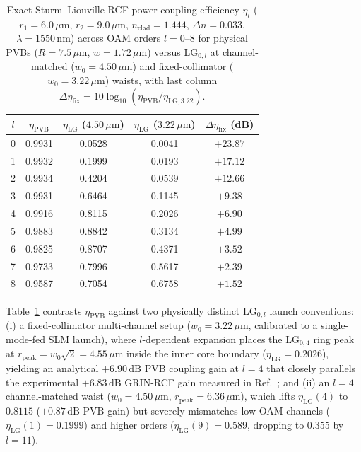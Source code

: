 \documentclass[aps,pra,reprint,nofootinbib,floatfix,longbibliography]{revtex4-2}
\begin{document}
\begin{table}[t]
\caption{Exact Sturm--Liouville RCF power coupling efficiency $\eta_l$ ($r_1 = 6.0\,\mu\mathrm{m}$, $r_2 = 9.0\,\mu\mathrm{m}$, $n_{\mathrm{clad}} = 1.444$, $\Delta n = 0.033$, $\lambda = 1550\,\mathrm{nm}$) across OAM orders $l = 0\text{--}8$ for physical PVBs ($R = 7.5\,\mu\mathrm{m}$, $w = 1.72\,\mu\mathrm{m}$) versus $\mathrm{LG}_{0,l}$ at channel-matched ($w_0 = 4.50\,\mu\mathrm{m}$) and fixed-collimator ($w_0 = 3.22\,\mu\mathrm{m}$) waists, with last column $\Delta\eta_{\mathrm{fix}} = 10\log_{10}(\eta_{\mathrm{PVB}}/\eta_{\mathrm{LG},3.22})$.}
\label{tab:rcf_coupling}
\begin{ruledtabular}
\setlength{\tabcolsep}{3.2pt}
\begin{tabular}{ccccc}
$l$ & $\eta_{\mathrm{PVB}}$ & $\eta_{\mathrm{LG}}$ ($4.50\,\mu\mathrm{m}$) & $\eta_{\mathrm{LG}}$ ($3.22\,\mu\mathrm{m}$) & $\Delta\eta_{\mathrm{fix}}$ (dB) \\
\hline
0 & 0.9931 & 0.0528 & 0.0041 & $+23.87$ \\
1 & 0.9932 & 0.1999 & 0.0193 & $+17.12$ \\
2 & 0.9934 & 0.4204 & 0.0539 & $+12.66$ \\
3 & 0.9931 & 0.6464 & 0.1145 & $+9.38$ \\
4 & 0.9916 & 0.8115 & 0.2026 & $+6.90$ \\
5 & 0.9883 & 0.8842 & 0.3134 & $+4.99$ \\
6 & 0.9825 & 0.8707 & 0.4371 & $+3.52$ \\
7 & 0.9733 & 0.7996 & 0.5617 & $+2.39$ \\
8 & 0.9587 & 0.7054 & 0.6758 & $+1.52$ \\
\end{tabular}
\end{ruledtabular}
\end{table}

Table~\ref{tab:rcf_coupling} contrasts $\eta_{\mathrm{PVB}}$ against two physically distinct $\mathrm{LG}_{0,l}$ launch conventions: (i) a fixed-collimator multi-channel setup ($w_0 = 3.22\,\mu\mathrm{m}$, calibrated to a single-mode-fed SLM launch), where $l$-dependent expansion places the $\mathrm{LG}_{0,4}$ ring peak at $r_{\mathrm{peak}} = w_0\sqrt{2} = 4.55\,\mu\mathrm{m}$ inside the inner core boundary ($\eta_{\mathrm{LG}} = 0.2026$), yielding an analytical $+6.90\,\mathrm{dB}$ PVB coupling gain at $l = 4$ that closely parallels the experimental $+6.83\,\mathrm{dB}$ GRIN-RCF gain measured in Ref.~\cite{Villalba2023}; and (ii) an $l = 4$ channel-matched waist ($w_0 = 4.50\,\mu\mathrm{m}$, $r_{\mathrm{peak}} = 6.36\,\mu\mathrm{m}$), which lifts $\eta_{\mathrm{LG}}(4)$ to $0.8115$ ($+0.87\,\mathrm{dB}$ PVB gain) but severely mismatches low OAM channels ($\eta_{\mathrm{LG}}(1) = 0.1999$) and higher orders ($\eta_{\mathrm{LG}}(9) = 0.589$, dropping to $0.355$ by $l = 11$).
\end{document}
